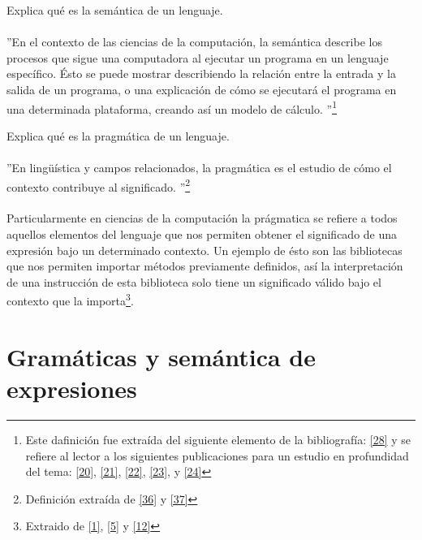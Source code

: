     \begin{exercise}
       Explica qué es la semántica de un lenguaje.    \\\\
        ''En el contexto de las ciencias de la computación, la semántica describe los procesos que sigue una computadora al ejecutar un programa en un lenguaje específico. Ésto se puede mostrar describiendo la relación entre la entrada y la salida de un programa, o una explicación de cómo se ejecutará el programa en una determinada plataforma, creando así un modelo de cálculo. ''\footnote{Este dafinición fue extraída del siguiente elemento de la bibliografía: \hyperlink{28}{[28]} y se refiere al lector a los siguientes publicaciones para un estudio en profundidad del tema:   \hyperlink{20}{[20]},  \hyperlink{21}{[21]},  \hyperlink{22}{[22]},  \hyperlink{23}{[23]}, y  \hyperlink{24}{[24]}}
    \end{exercise} 


    \begin{exercise}
        Explica qué es la pragmática de un lenguaje.   \\\\
         ''En lingüística y campos relacionados, la pragmática es el estudio de cómo el contexto contribuye al significado. ''\footnote{Definición extraída de  \hyperlink{36}{[36]} y \hyperlink{37}{[37]}}\\\\
        Particularmente en ciencias de la computación la prágmatica se refiere a todos aquellos elementos del lenguaje que nos permiten obtener el significado de una expresión bajo un determinado contexto.
        Un ejemplo de ésto son las bibliotecas que nos permiten importar métodos previamente definidos, así la interpretación de una instrucción de esta biblioteca solo tiene un significado válido bajo el contexto que la importa\footnote{Extraido de  \hyperlink{1}{[1]},  \hyperlink{5}{[5]} y   \hyperlink{12}{[12]}}.
    \end{exercise} 

    \bigskip

\section{Gramáticas y semántica de expresiones}

